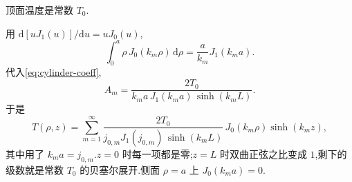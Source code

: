 \begin{example}
顶面温度是常数 $T_0$.
\end{example}
\begin{solution}
用 $\mathrm{d}[u J_1(u)]/\mathrm{d}u=u J_0(u)$,
\begin{equation}
  \int_0^{a}\rho\, J_0(k_m\rho)\,\mathrm{d}\rho
  =\frac{a}{k_m}J_1(k_m a).
\end{equation}
代入\eqref{eq:cylinder-coeff},
\begin{equation}
  A_m
  =\frac{2T_0}{k_m a\, J_1(k_m a)\,\sinh(k_m L)}.
\end{equation}
于是
\begin{equation}
  T(\rho,z)
  =\sum_{m=1}^{\infty}
    \frac{2T_0}{j_{0,m} J_1(j_{0,m})\, \sinh(k_m L)}
    \, J_0(k_m\rho)\sinh(k_m z),
\end{equation}
其中用了 $k_m a=j_{0,m}$.$z=0$ 时每一项都是零;$z=L$ 时双曲正弦之比变成 $1$,剩下的级数就是常数 $T_0$ 的贝塞尔展开.侧面 $\rho=a$ 上 $J_0(k_m a)=0$.
\end{solution}
